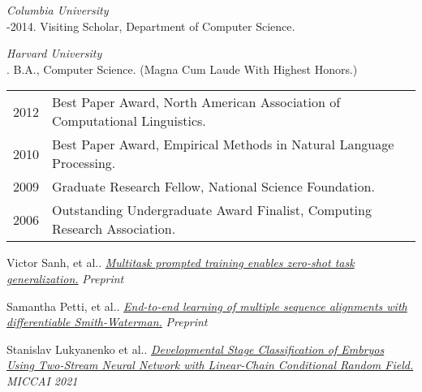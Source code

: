 \documentclass[11pt]{article}
\begin{document}
\medskip
\noindent\emph{Columbia University\vspace{0.02in}}\\
-2014. Visiting Scholar, Department of Computer Science.


\medskip
\noindent\emph{Harvard University\vspace{0.02in}}\\
. B.A., Computer Science. (Magna Cum Laude With Highest Honors.)

\bigskip


\medskip

\hspace{-1cm} \begin{tabular}{lp{11.5cm}}
2012 & Best Paper Award, North American Association of Computational Linguistics. \\
2010 & Best Paper Award, Empirical Methods in Natural Language Processing. \\
2009 & Graduate Research Fellow, National Science Foundation.  \\
2006 & Outstanding Undergraduate Award Finalist, Computing Research Association. \\

\end{tabular}
\bigskip

\medskip



\ind Victor Sanh, et al.. \emph{\href{ https://arxiv.org/pdf/2110.08207 }{ Multitask prompted training enables zero-shot task generalization.} }\emph{ Preprint }

\medskip



\ind Samantha Petti, et al.. \emph{\href{ http://repository.cshl.edu/id/eprint/40409/1/2021.Petti.multiple_sequence_alignments.pdf }{ End-to-end learning of multiple sequence alignments with differentiable Smith-Waterman.} }\emph{ Preprint }

\medskip



\ind Stanislav Lukyanenko et al.. \emph{\href{ https://www.ncbi.nlm.nih.gov/pmc/articles/PMC8526069/ }{ Developmental Stage Classification of Embryos Using Two-Stream Neural Network with Linear-Chain Conditional Random Field.} }\emph{ MICCAI 2021 }

\medskip
\end{document}
